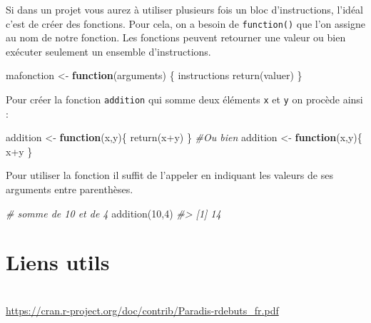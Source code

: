 \documentclass[
]{book}
\newenvironment{Shaded}{\begin{snugshade}}{\end{snugshade}}
\newcommand{\CommentTok}[1]{\textcolor[rgb]{0.56,0.35,0.01}{\textit{#1}}}
\newcommand{\ControlFlowTok}[1]{\textcolor[rgb]{0.13,0.29,0.53}{\textbf{#1}}}
\newcommand{\DecValTok}[1]{\textcolor[rgb]{0.00,0.00,0.81}{#1}}
\newcommand{\FunctionTok}[1]{\textcolor[rgb]{0.00,0.00,0.00}{#1}}
\newcommand{\NormalTok}[1]{#1}
\newcommand{\OtherTok}[1]{\textcolor[rgb]{0.56,0.35,0.01}{#1}}
\newcommand{\SpecialCharTok}[1]{\textcolor[rgb]{0.00,0.00,0.00}{#1}}
\theoremstyle{definition}
\theoremstyle{definition}
\theoremstyle{definition}
\theoremstyle{definition}
\theoremstyle{remark}
\begin{document}
Si dans un projet vous aurez à utiliser plusieurs fois un bloc d'instructions, l'idéal c'est de créer des fonctions. Pour cela, on a besoin de \texttt{function()} que l'on assigne au nom de notre fonction.
Les fonctions peuvent retourner une valeur ou bien exécuter seulement un ensemble d'instructions.

\begin{Shaded}
\begin{Highlighting}[]
\NormalTok{mafonction  }\OtherTok{\textless{}{-}} \ControlFlowTok{function}\NormalTok{(arguments) \{}
\NormalTok{  instructions}
  \FunctionTok{return}\NormalTok{(valuer)}
\NormalTok{\}}
\end{Highlighting}
\end{Shaded}

Pour créer la fonction \texttt{addition} qui somme deux éléments \texttt{x} et \texttt{y} on procède ainsi :

\begin{Shaded}
\begin{Highlighting}[]
\NormalTok{addition }\OtherTok{\textless{}{-}} \ControlFlowTok{function}\NormalTok{(x,y)\{}
  \FunctionTok{return}\NormalTok{(x}\SpecialCharTok{+}\NormalTok{y)}
\NormalTok{\}}
\CommentTok{\#Ou bien}
\NormalTok{addition }\OtherTok{\textless{}{-}} \ControlFlowTok{function}\NormalTok{(x,y)\{}
\NormalTok{  x}\SpecialCharTok{+}\NormalTok{y}
\NormalTok{\}}
\end{Highlighting}
\end{Shaded}

Pour utiliser la fonction il suffit de l'appeler en indiquant les valeurs de ses arguments entre parenthèses.

\begin{Shaded}
\begin{Highlighting}[]
\CommentTok{\# somme de 10 et de 4}
\FunctionTok{addition}\NormalTok{(}\DecValTok{10}\NormalTok{,}\DecValTok{4}\NormalTok{)}
\CommentTok{\#\textgreater{} [1] 14}
\end{Highlighting}
\end{Shaded}

\hypertarget{liens-utils}{%
\section*{Liens utils}\label{liens-utils}}

\citet{base}\strut \\
\url{https://cran.r-project.org/doc/contrib/Paradis-rdebuts_fr.pdf}
\end{document}
